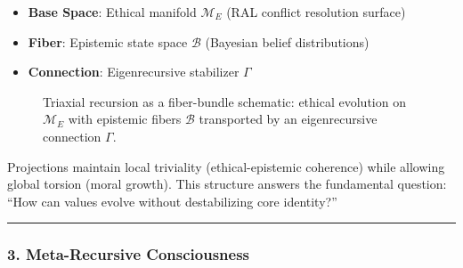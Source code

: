 \documentclass[
]{article}
\providecommand{\tightlist}{%
  \setlength{\itemsep}{0pt}\setlength{\parskip}{0pt}}
\begin{document}
\begin{itemize}
\tightlist
\item
  \textbf{Base Space}: Ethical manifold \(\mathcal{M}_E\) (RAL conflict
  resolution surface)\\
\item
  \textbf{Fiber}: Epistemic state space \(\mathcal{B}\) (Bayesian belief
  distributions)\\
\item
  \textbf{Connection}: Eigenrecursive stabilizer \(\Gamma \)
\end{itemize}

\begin{figure}[htbp]
\centering
{}
\caption{Triaxial recursion as a fiber-bundle schematic: ethical evolution on $\mathcal{M}_E$ with epistemic fibers $\mathcal{B}$ transported by an eigenrecursive connection $\Gamma$.}
\label{fig:fiber-bundle}
\end{figure}

Projections maintain local triviality (ethical-epistemic coherence)
while allowing global torsion (moral growth). This structure answers the
fundamental question: ``How can values evolve without destabilizing core
identity?''

\begin{center}\rule{0.5\linewidth}{0.5pt}\end{center}

\subsubsection{\texorpdfstring{\textbf{3. Meta-Recursive
Consciousness}}{3. Meta-Recursive Consciousness}}\label{meta-recursive-consciousness}
\end{document}
